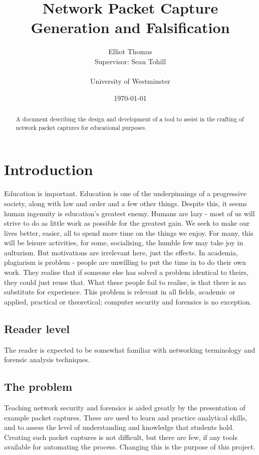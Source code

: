 \documentclass[10pt,a4paper,notitlepage]{report}
\author{Elliot Thomas\\ \small Supervisor: Sean Tohill\\ \\ University of Westminster}
\title{Network Packet Capture Generation and Falsification}
\date{\today}
\begin{document}
\maketitle
\begin{abstract}
\begin{center}
A document describing the design and development of a tool to assist in the crafting of network packet captures for educational purposes.
\end{center}
\end{abstract}
\pagebreak
\tableofcontents

\chapter{Introduction}
Education is important. Education is one of the underpinnings of a progressive society, along with law and order and a few other things.
Despite this, it seems human ingenuity is education's greatest enemy. Humans are lazy - most of us will strive to do as little work as possible for the greatest gain.
We seek to make our lives better, easier, all to spend more time on the things we enjoy. For many, this will be leisure activities, for some, socialising, the humble few may take joy in aulturism.
But motivations are irrelevant here, just the effects.
In academia, plagiarism is problem - people are unwilling to put the time in to do their own work. They realise that if someone else has solved a problem identical to theirs, they could just reuse that.
What these people fail to realise, is that there is no substitute for experience. This problem is relevant in all fields, academic or applied, practical or theoretical; computer security and forensics is no exception.

\section{Reader level}
The reader is expected to be somewhat familiar with networking terminology and forensic analysis techniques.

\section{The problem}
Teaching network security and forensics is aided greatly by the presentation of example packet captures. These are used to learn and practice analytical skills, and to assess the level of understanding and knowledge that students hold.
Creating such packet captures is not difficult, but there are few, if any tools available for automating the process. Changing this is the purpose of this project.
\end{document}
